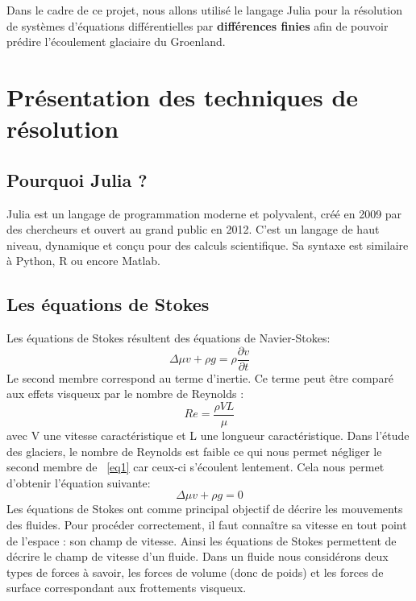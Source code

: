 \documentclass{article}
\begin{document}
Dans le cadre de ce projet, nous allons utilisé le langage Julia pour la résolution de systèmes d'équations différentielles par \textbf{différences finies} afin de pouvoir prédire l'écoulement glaciaire du Groenland.


\section{Présentation des techniques de résolution}

\subsection{Pourquoi Julia ?}

Julia est un langage de programmation moderne et polyvalent, créé en 2009 par des chercheurs et ouvert au grand public en 2012. C'est un langage de haut niveau, dynamique et conçu pour des calculs scientifique. Sa syntaxe est similaire à Python, R ou encore Matlab.
 


\subsection{Les équations de Stokes}

Les équations de Stokes résultent des équations de Navier-Stokes: 
\begin{equation}
\Delta \mu v + \rho g = \rho \frac {\partial v}{\partial t}
\label{equ1}
\end{equation}
Le second membre correspond au terme d'inertie.  Ce terme peut être comparé aux effets visqueux par le nombre de Reynolds : 
\begin{equation}
\textit{Re} = \frac{\rho V L}{\mu}
\end{equation}
avec V une vitesse caractéristique et L une longueur caractéristique. 
Dans l'étude des glaciers, le nombre de Reynolds est faible ce qui nous permet négliger le second membre de ~\eqref{eq1} car ceux-ci s'écoulent lentement.
Cela nous permet d'obtenir l'équation suivante: 
\begin{equation}
\Delta \mu v + \rho g = 0
\end{equation}
Les équations de Stokes \cite{site1} ont comme principal objectif de décrire les mouvements des fluides. 
Pour procéder correctement, il faut connaître sa vitesse en tout point de l'espace : son champ de vitesse. Ainsi les équations de Stokes permettent de décrire le champ de vitesse d'un fluide. 
Dans un fluide nous considérons deux types de forces à savoir, les forces de volume (donc de poids) et les forces de surface correspondant aux frottements visqueux. 
\end{document}

